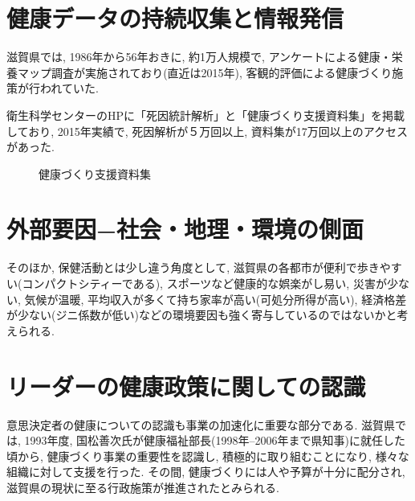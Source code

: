 \section{健康データの持続収集と情報発信}
滋賀県では, 1986年から56年おきに, 約1万人規模で, アンケートによる健康・栄養マップ調査が実施されており(直近は2015年), 客観的評価による健康づくり施策が行われていた.

衛生科学センターのHPに「死因統計解析」と「健康づくり支援資料集」を掲載しており, 2015年実績で, 死因解析が５万回以上, 資料集が17万回以上のアクセスがあった.
\begin{figure}[h!]
	\begin{center}
		\caption{健康づくり支援資料集}\label{fig1}
	\end{center}
\end{figure}




\section{外部要因−社会・地理・環境の側面}

そのほか, 保健活動とは少し違う角度として, 滋賀県の各都市が便利で歩きやすい(コンパクトシティーである), スポーツなど健康的な娯楽がし易い, 災害が少ない, 気候が温暖, 平均収入が多くて持ち家率が高い(可処分所得が高い), 経済格差が少ない(ジニ係数が低い)などの環境要因も強く寄与しているのではないかと考えられる.


\section{リーダーの健康政策に関しての認識}
意思決定者の健康についての認識も事業の加速化に重要な部分である.
滋賀県では, 1993年度, 国松善次氏が健康福祉部長(1998年--2006年まで県知事)に就任した頃から,
健康づくり事業の重要性を認識し, 積極的に取り組むことになり, 様々な組織に対して支援を行った.
その間, 健康づくりには人や予算が十分に配分され, 滋賀県の現状に至る行政施策が推進されたとみられる.

